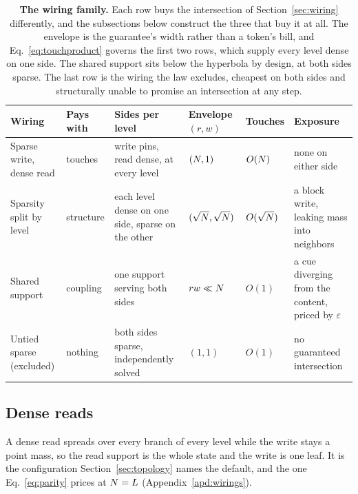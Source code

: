 \begin{table}[H]
\centering
\scriptsize
\caption{\textbf{The wiring family.} Each row buys the intersection of Section~\ref{sec:wiring} differently, and the subsections below construct the three that buy it at all. The envelope is the guarantee's width rather than a token's bill, and Eq.~\eqref{eq:touchproduct} governs the first two rows, which supply every level dense on one side. The shared support sits below the hyperbola by design, at both sides sparse. The last row is the wiring the law excludes, cheapest on both sides and structurally unable to promise an intersection at any step.}
\label{tab:wirings}
\setlength{\tabcolsep}{4pt}
\begin{tabular}{@{}l l >{\raggedright\arraybackslash}p{} l l >{\raggedright\arraybackslash}p{}@{}}
\toprule
Wiring & Pays with & Sides per level & Envelope $(r,w)$ & Touches & Exposure \\
\midrule
Sparse write, dense read & touches   & write pins, read dense, at every level         & $(N, 1)$                        & $O(N)$        & none on either side \\
Sparsity split by level  & structure & each level dense on one side, sparse on the other & $(\sqrt{N}, \sqrt{N})$       & $O(\sqrt{N})$ & a block write, leaking mass into neighbors \\
Shared support           & coupling  & one support serving both sides                 & $r w \ll N$                     & $O(1)$           & a cue diverging from the content, priced by $\varepsilon$ \\
\addlinespace
Untied sparse (excluded) & nothing   & both sides sparse, independently solved        & $(1,1)$                            & $O(1)$           & no guaranteed intersection \\
\bottomrule
\end{tabular}
\end{table}

\subsection{Dense reads}
\label{sec:denseread}

A dense read spreads over every branch of every level while the write stays a point mass, so the read support is the whole state and the write is one leaf. It is the configuration Section~\ref{sec:topology} names the default, and the one Eq.~\eqref{eq:parity} prices at $N = L$ (Appendix~\ref{apd:wirings}).

